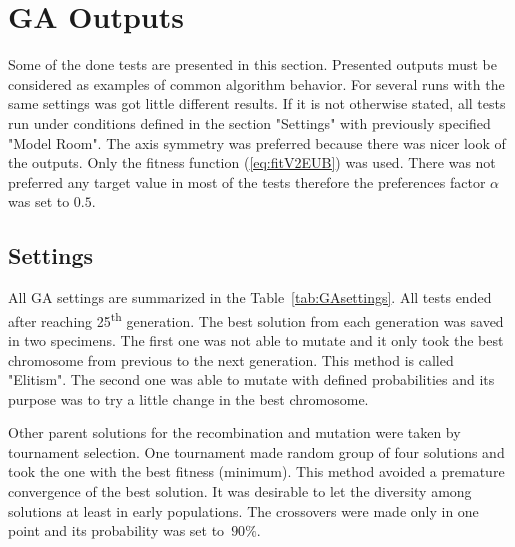\section{GA Outputs}
Some of the done tests are presented in this section. Presented outputs must be considered as examples of common algorithm behavior. For several runs with the same settings was got little different results. If it is not otherwise stated, all tests run under conditions defined in the section "Settings" with previously specified "Model Room". The axis symmetry was preferred because there was nicer look of the outputs. Only the fitness function (\ref{eq:fitV2EUB}) was used. There was not preferred any target value in most of the tests therefore the preferences factor $\alpha$ was set to $0.5$.

\subsection{Settings}

All GA settings are summarized in the Table~\ref{tab:GAsettings}. All tests ended after reaching 25\textsuperscript{th} generation. The best solution from each generation was saved in two specimens. The first one was not able to mutate and it only took the best chromosome from previous to the next generation. This method is called "Elitism". The second one was able to mutate with defined probabilities and its purpose was to try a little change in the best chromosome.

Other parent solutions for the recombination and mutation were taken by tournament selection. One tournament made random group of four solutions and took the one with the best fitness (minimum). This method avoided a premature convergence of the best solution. It was desirable to let the diversity among solutions at least in early populations. The crossovers were made only in one point and its probability was set to~$90 \%$.

